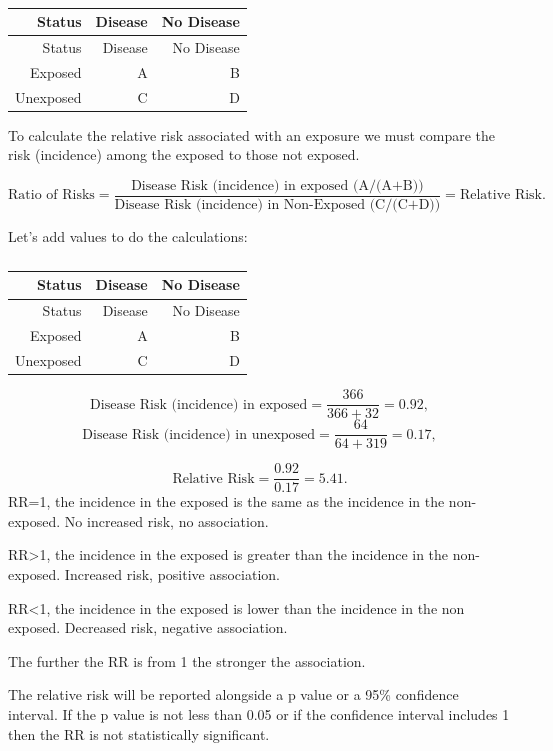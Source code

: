 \documentclass[
]{book}
\begin{document}
\begin{longtable}[]{@{}rrr@{}}
\caption{\label{tab:table14}}\tabularnewline
\toprule
Status & Disease & No Disease \\
\midrule
\endfirsthead
\toprule
Status & Disease & No Disease \\
\midrule
\endhead
Exposed & A & B \\
Unexposed & C & D \\
\bottomrule
\end{longtable}

To calculate the relative risk associated with an exposure we must compare the risk (incidence) among the exposed to those not exposed.

\[\textrm{Ratio of Risks} = \frac{\textrm{Disease Risk (incidence) in exposed (A/(A+B))}}{ \textrm{Disease Risk (incidence) in Non-Exposed (C/(C+D))}} = \textrm{Relative Risk}. \]

Let's add values to do the calculations:

\begin{longtable}[]{@{}rrr@{}}
\caption{\label{tab:table15}}\tabularnewline
\toprule
Status & Disease & No Disease \\
\midrule
\endfirsthead
\toprule
Status & Disease & No Disease \\
\midrule
\endhead
Exposed & A & B \\
Unexposed & C & D \\
\bottomrule
\end{longtable}

\[\textrm{Disease Risk (incidence) in exposed}=\frac{366}{366+32}=0.92,\]
\[\textrm{Disease Risk (incidence) in unexposed}=\frac{64}{64+319}=0.17,\]

\[\textrm{Relative Risk}=\frac{0.92}{0.17}=5.41.\]
RR=1, the incidence in the exposed is the same as the incidence in the non-exposed. No increased risk, no association.

RR\textgreater1, the incidence in the exposed is greater than the incidence in the non-exposed. Increased risk, positive association.

RR\textless1, the incidence in the exposed is lower than the incidence in the non exposed. Decreased risk, negative association.

The further the RR is from 1 the stronger the association.

The relative risk will be reported alongside a p value or a 95\% confidence interval. If the p value is not less than 0.05 or if the confidence interval includes 1 then the RR is not statistically significant.
\end{document}
